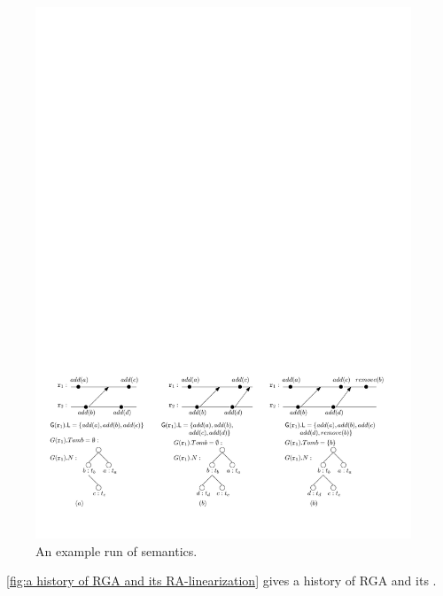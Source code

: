 \begin{figure}[t]
  \centering
  \includegraphics[width=0.9 \textwidth]{figures/ExplainSemantics.pdf}
\vspace{-10pt}
  \caption{An example run of semantics.}
  \label{fig:an example run of semantics}
\end{figure}


\figurename~\ref{fig:a history of RGA and its RA-linearization} gives a history of RGA and its \crdtlinearization{}. 

